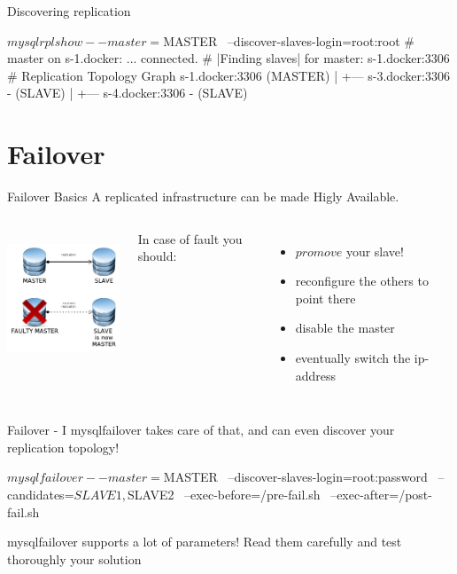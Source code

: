 \documentclass{beamer}[10]
\begin{document}


\begin{pyframe}{Discovering replication}
\begin{bashcode}
$ mysqlrplshow --master=$MASTER \
    --discover-slaves-login=root:root
# master on s-1.docker: ... connected.
# |Finding slaves| for master: s-1.docker:3306
# Replication Topology Graph
s-1.docker:3306 (MASTER)
   |
   +--- s-3.docker:3306 - (SLAVE)
   |
   +--- s-4.docker:3306 - (SLAVE)
\end{bashcode}
\end{pyframe}



%
%

\section{Failover}
\begin{pyframe}{Failover Basics}
A replicated infrastructure can be made Higly Available.
\begin{columns}

\includegraphics[height=4cm]{images/mysql-promote-slave.jpg}

%
In case of fault you should:
 \begin{itemize}
 \item $promove$ your slave!
 \item reconfigure the others to point there
 \item disable the master
 \item eventually switch the ip-address
 \end{itemize}

\end{columns}
\end{pyframe}

\begin{pyframe}{Failover - I}
mysqlfailover takes care of that, and can even discover your
replication topology!

\begin{bashcode}
$ mysqlfailover --master=$MASTER \
    --discover-slaves-login=root:password \
    --candidates=$SLAVE1,$SLAVE2 \
    --exec-before=/pre-fail.sh \
    --exec-after=/post-fail.sh
\end{bashcode}
{\large
    mysqlfailover supports a lot of parameters!
    Read them carefully and test thoroughly your
    solution
    }
\end{pyframe}
\end{document}

